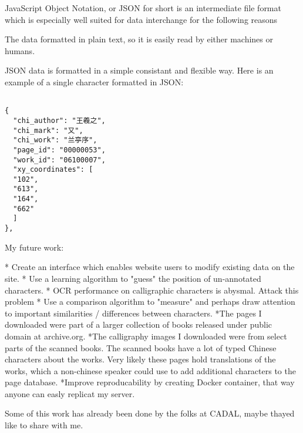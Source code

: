 
JavaScript Object Notation, or JSON for short is an intermediate file format which is especially well suited for data interchange for the following reasons

The data formatted in plain text, so it is easily read by either machines or humans.

JSON data is formatted in a simple consistant and flexible way.  Here is an example of a single character formatted in JSON:

\begin{verbatim}
    
{
  "chi_author": "王羲之",
  "chi_mark": "又",
  "chi_work": "兰亭序",
  "page_id": "00000053",
  "work_id": "06100007",
  "xy_coordinates": [
  "102",
  "613",
  "164",
  "662"
  ]
},
\end{verbatim}


My future work:
        
        *  Create an interface which enables website users to modify existing data on the site.
        *  Use a learning algorithm to "guess" the position of un-annotated characters.
        *  OCR performance on calligraphic characters is abysmal.  Attack this problem
        *  Use a comparison algorithm to "measure" and perhaps draw attention to important similarities / differences between characters.
        *The pages I downloaded were part of a larger collection of books released under public domain at archive.org.
        *The calligraphy images I downloaded were from select parts of the scanned books.  The scanned books have a lot of typed Chinese characters about the works.  Very likely these pages hold translations of the works, which a non-chinese speaker could use to add additional characters to the page database.
        *Improve reproducability by creating Docker container, that way anyone can easly replicat my server.

    Some of this work has already been done by the folks at CADAL, maybe thayed like to share with me.
